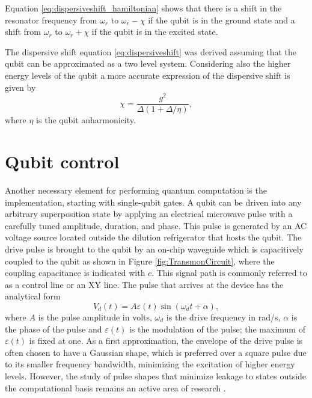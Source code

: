 Equation \ref{eq:dispersiveshift_hamiltonian} shows that there is a shift in the resonator frequency from $\omega_r$ to $\omega_r - \chi$ if the qubit is in the ground state and a shift from $\omega_r$ to $\omega_r + \chi$ if the qubit is in the excited state.

The dispersive shift equation \ref{eq:dispersiveshift} was derived assuming that the qubit can be approximated as a two level system.
Considering also the higher energy levels of the qubit a more accurate expression of the dispersive shift is given by 
\begin{equation}
    \chi = \frac{g^2}{\Delta(1+\Delta/\eta)},
\end{equation} 
where $\eta$ is the qubit anharmonicity.

\section{Qubit control}\label{sec:qubit_control}
Another necessary element for performing quantum computation is the implementation, starting with single-qubit gates. 
A qubit can be driven into any arbitrary superposition state by applying an electrical microwave pulse with a carefully tuned amplitude, duration, and phase.
This pulse is generated by an AC voltage source located outside the dilution refrigerator that hosts the qubit.
The drive pulse is brought to the qubit by an on-chip waveguide which is capacitively coupled to the qubit as shown in Figure \ref{fig:TransmonCircuit}, where the coupling capacitance is indicated with $c$.
This signal path is commonly referred to as a control line or an XY line. The pulse that arrives at the device has the analytical form
\begin{equation}\label{eq:drive_pulse}
    V_d(t) = A\varepsilon(t)\sin{(\omega_d t + \alpha)},
\end{equation}
where $A$ is the pulse amplitude in volts, $\omega_d$ is the drive frequency in rad/s, $\alpha$ is the phase of the pulse and $\varepsilon(t)$ is the modulation of the pulse; the maximum of $\varepsilon(t)$ is fixed at one.
As a first approximation, the envelope of the drive pulse is often chosen to have a Gaussian shape, which is preferred over a square pulse due to its smaller frequency bandwidth, minimizing the excitation of higher energy levels.
However, the study of pulse shapes that minimize leakage to states outside the computational basis remains an active area of research \cite{chiaro2025activeleakagecancellationsingle}.

